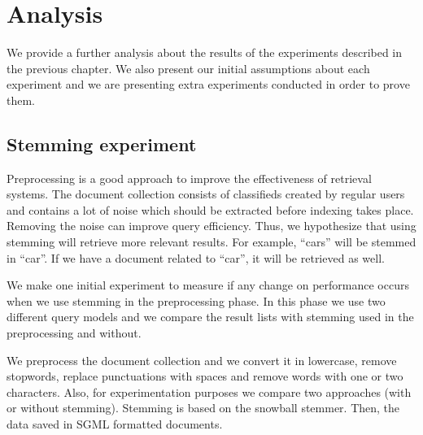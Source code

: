 \chapter{Analysis}

We provide a further analysis about the results of the experiments described in the previous chapter. We also present our initial assumptions about each experiment and we are presenting extra experiments conducted in order to prove them.

\section{Stemming experiment}

Preprocessing is a good approach to improve the effectiveness of retrieval systems. The document collection consists of classifieds created by regular users and contains a lot of noise which should be extracted before indexing takes place. Removing the noise can improve query efficiency. Thus, we hypothesize that using stemming will retrieve more relevant results. For example, ``cars'' will be stemmed in ``car''. If we have a document related to ``car'', it will be retrieved as well.

We make one initial experiment to measure if any change on performance occurs when we use stemming in the preprocessing phase. In this phase we use two different query models and we compare the result lists with stemming used in the preprocessing and without.

We preprocess the document collection and we convert it in lowercase, remove stopwords, replace punctuations with spaces and remove words with one or two characters. Also, for experimentation purposes we compare two approaches (with or without  stemming). Stemming is based on the snowball stemmer. Then, the data saved in SGML formatted documents.



